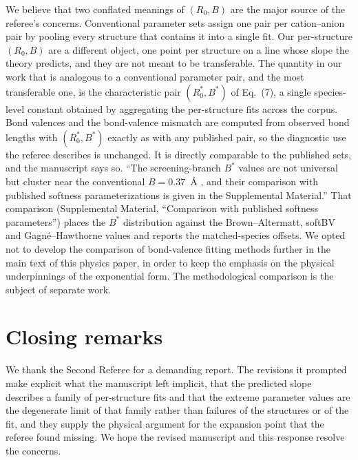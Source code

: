 \documentclass[11pt]{article}
\begin{document}
We believe that two conflated meanings of $(R_0,B)$ are the major source
of the referee's concerns.  Conventional parameter sets assign one
pair per cation--anion pair by pooling every structure that contains
it into a single fit.  Our per-structure $(R_0,B)$ are a different
object, one point per structure on a line whose slope the theory
predicts, and they are not meant to be transferable.  The quantity in
our work that is analogous to a conventional parameter pair, and the
most transferable one, is the characteristic pair $(R_0^*,B^*)$ of
Eq.~(7), a single species-level constant obtained by aggregating the
per-structure fits across the corpus.  Bond valences and the
bond-valence mismatch are computed from observed bond lengths with
$(R_0^*,B^*)$ exactly as with any published pair, so the diagnostic
use the referee describes is unchanged.  It is directly comparable to
the published sets, and the manuscript says so.  ``The
screening-branch $B^*$ values are not universal but cluster near the
conventional $B=0.37$~\AA{} \cite{Brown1985}, and their comparison
with published softness parameterizations
\cite{Adams2001,Chen2017,Gagn2015} is given in the Supplemental
Material.''  That comparison (Supplemental Material, ``Comparison
with published softness parameters'') places the $B^*$ distribution
against the Brown--Altermatt, softBV and Gagn\'e--Hawthorne values
and reports the matched-species offsets.  We opted not to develop the
comparison of bond-valence fitting methods further in the main text
of this physics paper, in order to keep the emphasis on the physical
underpinnings of the exponential form.  The methodological comparison
is the subject of separate work.

\section*{Closing remarks}

We thank the Second Referee for a demanding report.  The revisions it
prompted make explicit what the manuscript left implicit, that the
predicted slope describes a family of per-structure fits and that the
extreme parameter values are the degenerate limit of that family
rather than failures of the structures or of the fit, and they supply
the physical argument for the expansion point that the referee found
missing.  We hope the revised manuscript and this response resolve
the concerns.



\end{document}
